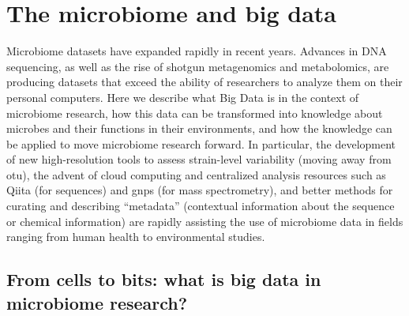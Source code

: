 \glsresetall

\section{The microbiome and big data}\label{section_bigdata}

Microbiome datasets have expanded rapidly in recent years. Advances in DNA
sequencing, as well as the rise of shotgun metagenomics and metabolomics, are
producing datasets that exceed the ability of researchers to analyze them on
their personal computers. Here we describe what Big Data is in the context of
microbiome research, how this data can be transformed into knowledge about microbes
and their functions in their environments, and how the knowledge can be applied to
move microbiome research forward. In particular, the development of new high-resolution
tools to assess strain-level variability (moving away from \gls{otu}), the advent
of cloud computing and centralized analysis resources such as Qiita (for sequences)
and \gls{gnps} (for mass spectrometry), and better methods for curating and describing
``metadata'' (contextual information about the sequence or chemical information) are
rapidly assisting the use of microbiome data in fields ranging from human health
to environmental studies.

\subsection{From cells to bits: what is big data in microbiome research?}

